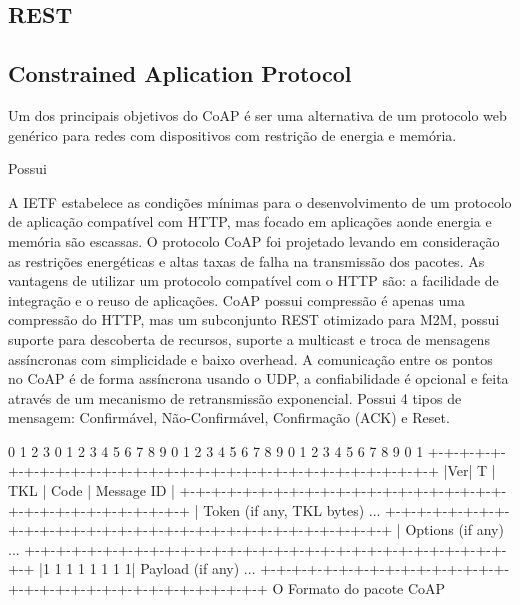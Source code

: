 \subsection{REST}

\subsection{Constrained Aplication Protocol}

Um dos principais objetivos do CoAP \'e ser uma alternativa de um protocolo web gen\'erico para redes com dispositivos com restri\c{c}\~ao de energia e mem\'oria.

Possui 

A IETF estabelece as condi\c{c}\~oes m\'inimas para o desenvolvimento de um protocolo de aplica\c{c}\~ao compat\'ivel com HTTP, mas focado em aplica\c{c}\~oes aonde energia e mem\'oria s\~ao escassas. O protocolo CoAP foi projetado levando em considera\c{c}\~ao as restri\c{c}\~oes energ\'eticas e altas taxas de falha na transmiss\~ao dos pacotes. As vantagens de utilizar um protocolo compat\'ivel com o HTTP s\~ao: a facilidade de integra\c{c}\~ao e o reuso de aplica\c{c}\~oes. CoAP possui compress\~ao \'e apenas uma compress\~ao do HTTP, mas um subconjunto REST otimizado para M2M, possui suporte para descoberta de recursos, suporte a multicast e troca de mensagens ass\'incronas com simplicidade e baixo overhead. A comunica\c{c}\~ao entre os pontos no CoAP \'e de forma ass\'incrona usando o UDP, a confiabilidade \'e opcional e feita atrav\'es de um mecanismo de retransmiss\~ao exponencial. Possui 4 tipos de mensagem: Confirm\'avel, N\~ao-Confirm\'avel, Confirma\c{c}\~ao (ACK) e Reset.


     0                   1                   2                   3
    0 1 2 3 4 5 6 7 8 9 0 1 2 3 4 5 6 7 8 9 0 1 2 3 4 5 6 7 8 9 0 1
   +-+-+-+-+-+-+-+-+-+-+-+-+-+-+-+-+-+-+-+-+-+-+-+-+-+-+-+-+-+-+-+-+
   |Ver| T |  TKL  |      Code     |          Message ID           |
   +-+-+-+-+-+-+-+-+-+-+-+-+-+-+-+-+-+-+-+-+-+-+-+-+-+-+-+-+-+-+-+-+
   |   Token (if any, TKL bytes) ...
   +-+-+-+-+-+-+-+-+-+-+-+-+-+-+-+-+-+-+-+-+-+-+-+-+-+-+-+-+-+-+-+-+
   |   Options (if any) ...
   +-+-+-+-+-+-+-+-+-+-+-+-+-+-+-+-+-+-+-+-+-+-+-+-+-+-+-+-+-+-+-+-+
   |1 1 1 1 1 1 1 1|    Payload (if any) ...
   +-+-+-+-+-+-+-+-+-+-+-+-+-+-+-+-+-+-+-+-+-+-+-+-+-+-+-+-+-+-+-+-+
   O Formato do pacote CoAP  \cite{draft-ietf-core-coap-18}


